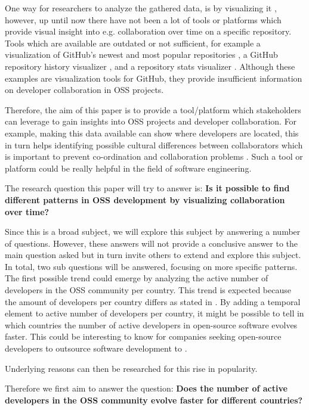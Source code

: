 \documentclass[acmtog, authorversion]{acmart}
\begin{document}
One way for researchers to analyze the gathered data, is by visualizing it \cite{Heller}, however, up until now there have not been a lot of tools or platforms which provide visual insight into e.g. collaboration over time on a specific repository.
Tools which are available are outdated \cite{Heller} or not sufficient, for example a visualization of GitHub's newest and most popular repositories \cite{donnemartin2016}, a GitHub repository history visualizer \cite{artzub2013}, and a repository stats visualizer \cite{bajaj2013}.
Although these examples are visualization tools for GitHub, they provide insufficient information on developer collaboration in OSS projects.

Therefore, the aim of this paper is to provide a tool/platform which stakeholders can leverage to gain insights into OSS projects and developer collaboration.
For example, making this data available can show where developers are located, this in turn helps identifying possible cultural differences between collaborators which is important to prevent co-ordination and collaboration problems \cite{Mishra2014}.
Such a tool or platform could be really helpful in the field of software engineering.

The research question this paper will try to answer is: \textbf{Is it possible to find different patterns in OSS development by visualizing collaboration over time?}

Since this is a broad subject, we will explore this subject by answering a number of questions.
However, these answers will not provide a conclusive answer to the main question asked but in turn invite others to extend and explore this subject.
In total, two sub questions will be answered, focusing on more specific patterns.
The first possible trend could emerge by analyzing the active number of developers in the OSS community per country.
This trend is expected because the amount of developers per country differs as stated in \cite{StackOverflow2017}.
By adding a temporal element to active number of developers per country, it might be possible to tell in which countries the number of active developers in open-source software evolves faster.
This could be interesting to know for companies seeking open-source developers to outsource software development to \cite{haefliger2008code}.

Underlying reasons can then be researched for this rise in popularity.

Therefore we first aim to answer the question: \textbf{Does the number of active developers in the OSS community evolve faster for different countries?}
\end{document}
